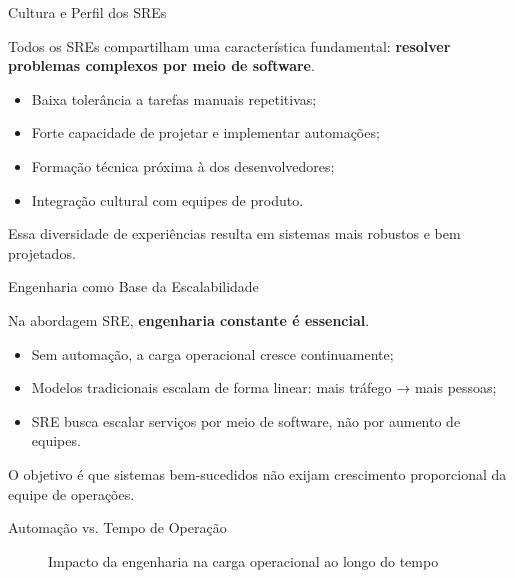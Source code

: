 \documentclass[9pt]{beamer}
\begin{document}
\begin{frame}{Cultura e Perfil dos SREs}

Todos os SREs compartilham uma característica fundamental:
\textbf{resolver problemas complexos por meio de software}.

\begin{itemize}
  \item Baixa tolerância a tarefas manuais repetitivas;
  \item Forte capacidade de projetar e implementar automações;
  \item Formação técnica próxima à dos desenvolvedores;
  \item Integração cultural com equipes de produto.
\end{itemize}

Essa diversidade de experiências resulta em sistemas mais robustos
e bem projetados.

\end{frame}
\begin{frame}{Engenharia como Base da Escalabilidade}

Na abordagem SRE, \textbf{engenharia constante é essencial}.

\begin{itemize}
  \item Sem automação, a carga operacional cresce continuamente;
  \item Modelos tradicionais escalam de forma linear:
  mais tráfego → mais pessoas;
  \item SRE busca escalar serviços por meio de software,
  não por aumento de equipes.
\end{itemize}

O objetivo é que sistemas bem-sucedidos não exijam crescimento
proporcional da equipe de operações.

\end{frame}
\begin{frame}{Automação vs. Tempo de Operação}

\begin{figure}
\centering
{}
\caption{Impacto da engenharia na carga operacional ao longo do tempo}
\end{figure}

\end{frame}
\end{document}

